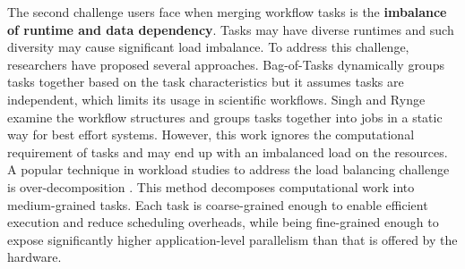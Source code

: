 The second challenge users face when merging workflow tasks is the \textbf{imbalance of runtime and data dependency}. Tasks may have diverse runtimes and such diversity may cause significant load imbalance. To address this challenge, researchers have proposed several approaches. Bag-of-Tasks \cite{Hussin2010, Celaya2010, Oprescu2010} dynamically groups tasks together based on the task characteristics but it assumes tasks are independent, which limits its usage in scientific workflows. Singh \cite{Singh2008} and Rynge \cite{Rynge2012} examine the workflow structures and groups tasks together into jobs in a static way for best effort systems. However, this work ignores the computational requirement of tasks and may end up with an imbalanced load on the resources. A popular technique in workload studies to address the load balancing challenge is over-decomposition \cite{Lifflander2012}. This method decomposes computational work into medium-grained tasks. Each task is coarse-grained enough to enable efficient execution and reduce scheduling overheads, while being fine-grained enough to expose significantly higher application-level parallelism than that is offered by the hardware. 




